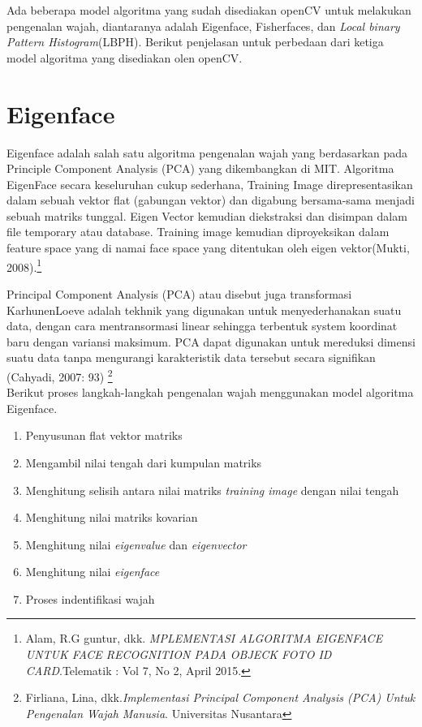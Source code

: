 Ada beberapa model algoritma yang sudah disediakan openCV untuk melakukan pengenalan wajah, diantaranya adalah
Eigenface, Fisherfaces, dan \emph{Local binary Pattern Histogram}(LBPH). Berikut penjelasan untuk perbedaan dari ketiga model algoritma yang disediakan olen openCV.
\section{Eigenface}

Eigenface adalah salah satu algoritma pengenalan wajah yang berdasarkan pada Principle Component Analysis (PCA) yang dikembangkan di MIT.
Algoritma EigenFace secara keseluruhan cukup sederhana, Training Image direpresentasikan dalam sebuah vektor flat (gabungan vektor) dan digabung
bersama-sama menjadi sebuah matriks tunggal. Eigen Vector kemudian diekstraksi dan disimpan dalam file temporary atau database. Training image
kemudian diproyeksikan dalam feature space yang di namai face space yang ditentukan oleh eigen vektor(Mukti, 2008).\footnote{Alam, R.G guntur, dkk.
\emph{MPLEMENTASI ALGORITMA EIGENFACE UNTUK FACE RECOGNITION PADA OBJECK FOTO ID CARD}.Telematik : Vol 7, No 2, April 2015.}

Principal Component Analysis (PCA) atau disebut juga transformasi KarhunenLoeve adalah tekhnik yang digunakan untuk menyederhanakan suatu data, dengan cara mentransormasi linear sehingga terbentuk
system koordinat baru dengan variansi maksimum. PCA dapat digunakan untuk mereduksi dimensi suatu data tanpa mengurangi karakteristik data tersebut secara signifikan (Cahyadi, 2007: 93)
\footnote{Firliana, Lina, dkk.\emph{Implementasi Principal Component Analysis (PCA) Untuk Pengenalan Wajah Manusia}. Universitas Nusantara}\\

Berikut proses langkah-langkah pengenalan wajah menggunakan model algoritma Eigenface.
\begin{enumerate}[1. ]
    \item Penyusunan flat vektor matriks
    \item Mengambil nilai tengah dari kumpulan matriks
    \item Menghitung selisih antara nilai matriks \emph{training image} dengan nilai tengah
    \item Menghitung nilai matriks kovarian
    \item Menghitung nilai \emph{eigenvalue} dan \emph{eigenvector}
    \item Menghitung nilai \emph{eigenface}
    \item Proses indentifikasi wajah 
\end{enumerate}

